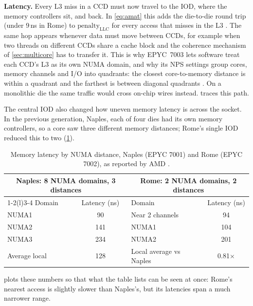 \textbf{Latency.} Every L3 miss in a CCD must now travel to the IOD, where the memory controllers sit, and back. In \cref{eq:amat} this adds the die-to-die round trip (under 9\,ns in Rome) to $\mathrm{penalty}_{\mathrm{LLC}}$ for every access that misses in the L3 \cite{naffziger2020chiplet}. The same hop appears whenever data must move between CCDs, for example when two threads on different CCDs share a cache block and the coherence mechanism of \cref{sec:multicore} has to transfer it. This is why EPYC~7003 lets software treat each CCD's L3 as its own NUMA domain, and why its NPS settings group cores, memory channels and I/O into quadrants: the closest core-to-memory distance is within a quadrant and the farthest is between diagonal quadrants \cite{amd2022epyc7003}. On a monolithic die the same traffic would cross on-chip wires instead.  traces this path.




The central IOD also changed how uneven memory latency is across the socket. In the previous generation, Naples, each of four dies had its own memory controllers, so a core saw three different memory distances; Rome's single IOD reduced this to two (\cref{tab:numa-latency}).

\begin{table}[htbp]
  \centering
  \caption[Memory latency by NUMA distance, Naples and Rome, as reported by AMD]{Memory latency by NUMA distance, Naples (EPYC 7001) and Rome (EPYC 7002), as reported by AMD \cite[Fig.~2.2.6]{naffziger2020chiplet}.}
  \label{tab:numa-latency}
  \small
  \begin{tabular}{@{}lclc@{}}
    \toprule
    \multicolumn{2}{c}{\textbf{Naples: 8 NUMA domains, 3 distances}} & \multicolumn{2}{c}{\textbf{Rome: 2 NUMA domains, 2 distances}} \\
    \cmidrule(r){1-2}\cmidrule(l){3-4}
    Domain & Latency (ns) & Domain & Latency (ns) \\
    \midrule
    NUMA1 & 90 & Near 2 channels & 94 \\
    NUMA2 & 141 & NUMA1 & 104 \\
    NUMA3 & 234 & NUMA2 & 201 \\
    Average local & 128 & Local average vs Naples & 0.81$\times$ \\
    \bottomrule
  \end{tabular}
\end{table}
 plots these numbers so that what the table lists can be seen at once: Rome's nearest access is slightly slower than Naples's, but its latencies span a much narrower range.

